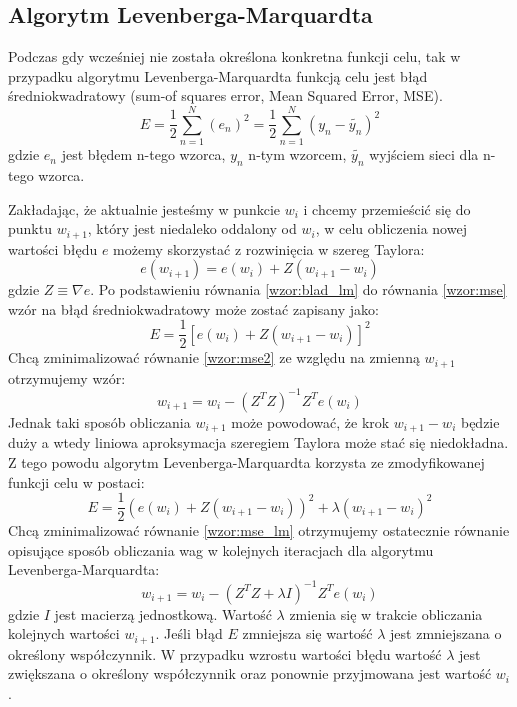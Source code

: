\subsection*{Algorytm Levenberga-Marquardta}
Podczas gdy wcześniej nie została określona konkretna funkcji celu, tak w przypadku algorytmu Levenberga-Marquardta funkcją celu jest błąd średniokwadratowy (sum-of squares error, Mean Squared Error, MSE)\cite[str. 290]{Bishop}.
\begin{equation}
	\label{wzor:mse}
	E = \frac{1}{2} \sum_{n=1}^N(e_n)^2 = \frac{1}{2} \sum_{n=1}^N(y_n - \tilde{y_n})^2
\end{equation}
gdzie $e_n$ jest błędem n-tego wzorca, $y_n$ n-tym wzorcem, $\tilde{y_n}$ wyjściem sieci dla n-tego wzorca.

Zakładając, że aktualnie jesteśmy w punkcie $w_{i}$ i chcemy przemieścić się do punktu $w_{i+1}$, który jest niedaleko oddalony od $w_{i}$, w celu obliczenia nowej wartości błędu $e$ możemy skorzystać z rozwinięcia w szereg Taylora:
\begin{equation}
	\label{wzor:blad_lm}
	e(w_{i+1}) = e(w_{i}) + Z(w_{i+1} - w_{i})
\end{equation}
gdzie $Z \equiv \nabla e$. Po podstawieniu równania \ref{wzor:blad_lm} do równania \ref{wzor:mse} wzór na błąd średniokwadratowy może zostać zapisany jako:
\begin{equation}
	\label{wzor:mse2}
	E = \frac{1}{2}[e(w_{i}) + Z(w_{i+1} - w_{i})]^2
\end{equation}
Chcą zminimalizować równanie \ref{wzor:mse2} ze względu na zmienną $w_{i+1}$ otrzymujemy wzór:
\begin{equation}
	w_{i+1} = w_{i} - (Z^TZ)^{-1}Z^Te(w_{i})
\end{equation}
Jednak taki sposób obliczania $w_{i+1}$ może powodować, że krok $w_{i+1} - w_{i}$ będzie duży a wtedy liniowa aproksymacja szeregiem Taylora może stać się niedokładna. Z tego powodu algorytm Levenberga-Marquardta korzysta ze zmodyfikowanej funkcji celu w postaci:
\begin{equation}
	\label{wzor:mse_lm}
	E = \frac{1}{2}(e(w_{i}) + Z(w_{i+1} - w_{i}))^2 + \lambda (w_{i+1} - w_{i})^2
\end{equation}
Chcą zminimalizować równanie \ref{wzor:mse_lm} otrzymujemy ostatecznie równanie opisujące sposób obliczania wag w kolejnych iteracjach dla algorytmu Levenberga-Marquardta:
\begin{equation}
	w_{i+1} = w_{i} -(Z^TZ + \lambda I)^{-1}Z^Te(w_{i})
\end{equation}
gdzie $I$ jest macierzą jednostkową. Wartość $\lambda$ zmienia się w trakcie obliczania kolejnych wartości $w_{i+1}$. Jeśli błąd $E$ zmniejsza się wartość $\lambda$ jest zmniejszana o określony współczynnik. W przypadku wzrostu wartości błędu wartość $\lambda$ jest zwiększana o określony współczynnik oraz ponownie przyjmowana jest wartość $w_i$.



